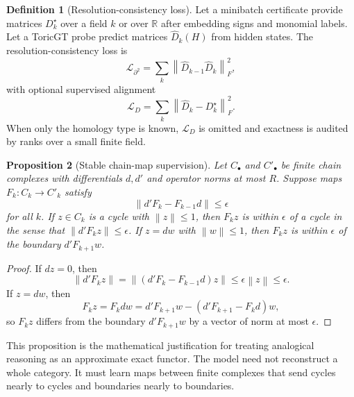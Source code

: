 \documentclass[11pt]{article}
\theoremstyle{definition}
\newtheorem{definition}{Definition}[section]
\theoremstyle{plain}
\newtheorem{proposition}[definition]{Proposition}
\theoremstyle{remark}
\numberwithin{equation}{section}
\newcommand{\R}{\mathbb{R}}
\newcommand{\norm}[1]{\left\lVert #1\right\rVert}
\begin{document}
\begin{definition}[Resolution-consistency loss]\label{def:resolution-loss}
Let a minibatch certificate provide matrices $D_k^\star$ over a field $k$ or over $\R$ after embedding signs and monomial labels.  Let a ToricGT probe predict matrices $\widehat D_k(H)$ from hidden states.  The resolution-consistency loss is
\begin{equation}
  \mathcal L_{\partial^2}=\sum_k\norm{\widehat D_{k-1}\widehat D_k}_F^2,
\end{equation}
with optional supervised alignment
\begin{equation}
  \mathcal L_D=\sum_k\norm{\widehat D_k-D_k^\star}_F^2.
\end{equation}
When only the homology type is known, $\mathcal L_D$ is omitted and exactness is audited by ranks over a small finite field.
\end{definition}

\begin{proposition}[Stable chain-map supervision]\label{prop:stable-chain-map}
Let $C_\bullet$ and $C'_\bullet$ be finite chain complexes with differentials $d,d'$ and operator norms at most $R$.  Suppose maps $F_k:C_k\to C'_k$ satisfy
\begin{equation}
  \norm{d'F_k-F_{k-1}d}\leq\epsilon
\end{equation}
for all $k$.  If $z\in C_k$ is a cycle with $\norm{z}\leq1$, then $F_kz$ is within $\epsilon$ of a cycle in the sense that $\norm{d'F_kz}\leq\epsilon$.  If $z=d w$ with $\norm{w}\leq1$, then $F_kz$ is within $\epsilon$ of the boundary $d'F_{k+1}w$.
\end{proposition}

\begin{proof}
If $dz=0$, then
\begin{equation}
  \norm{d'F_kz}=\norm{(d'F_k-F_{k-1}d)z}\leq\epsilon\norm{z}\leq\epsilon.
\end{equation}
If $z=dw$, then
\begin{equation}
  F_kz=F_kdw=d'F_{k+1}w-(d'F_{k+1}-F_kd)w,
\end{equation}
so $F_kz$ differs from the boundary $d'F_{k+1}w$ by a vector of norm at most $\epsilon$.
\end{proof}

This proposition is the mathematical justification for treating analogical reasoning as an approximate exact functor.  The model need not reconstruct a whole category.  It must learn maps between finite complexes that send cycles nearly to cycles and boundaries nearly to boundaries.
\end{document}
